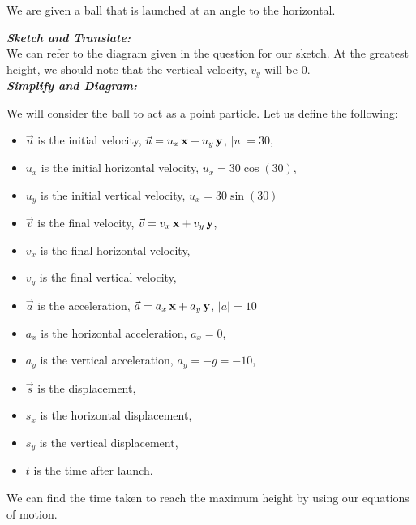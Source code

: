 %
%
%


\begin{subquestions}

We are given a ball that is launched at an angle to the horizontal.
	
\subquestion
	
\textbf{\textit{Sketch and Translate:}} \\
We can refer to the diagram given in the question for our sketch. At the greatest height, we should note that the vertical velocity, $v_y$ will be 0. \\




\textbf{\textit{Simplify and Diagram:}} 

We will consider the ball to act as a point particle. Let us define the following:
\begin{itemize}
	\item $\vec{u}$ is the initial velocity, $\vec{u} = u_x\,\mathbf{x} +u_y\,\mathbf{y}$,  $|u|=30$, 
	\item $u_x$ is the initial horizontal velocity, $u_x = 30\cos(30)$,
	\item $u_y$ is the initial vertical velocity, $u_x = 30\sin(30)$
	\item $\vec{v}$ is the final velocity, $\vec{v} = v_x\,\mathbf{x} +v_y\,\mathbf{y}$,
	\item $v_x$ is the final horizontal velocity,
	\item $v_y$ is the final vertical velocity,
	\item $\vec{a}$ is the acceleration, $\vec{a} = a_x\,\mathbf{x} +a_y\,\mathbf{y}$, $|a| = 10$
	\item $a_x$ is the horizontal acceleration, $a_x=0$,
	\item $a_y$ is the vertical acceleration, $a_y=-g=-10$,
	\item $\vec{s}$ is the displacement,
	\item $s_x$ is the horizontal displacement,
	\item $s_y$ is the vertical displacement,
	\item $t$ is the time after launch.
\end{itemize}
We can find the time taken to reach the maximum height by using our equations of motion. \\
	

\end{subquestions}
